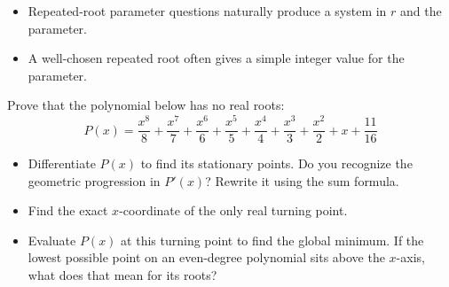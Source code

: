\begin{takeaways}
\begin{itemize}[leftmargin=*]
\item Repeated-root parameter questions naturally produce a system in $r$ and the parameter.
\item A well-chosen repeated root often gives a simple integer value for the parameter.
\end{itemize}
\end{takeaways}

\begin{problem}
Prove that the polynomial below has no real roots:
\[
P(x) = \frac{x^8}{8} + \frac{x^7}{7} + \frac{x^6}{6} + \frac{x^5}{5} + \frac{x^4}{4} + \frac{x^3}{3} + \frac{x^2}{2} + x + \frac{11}{16}
\]
\end{problem}

\begin{hintbox}
\begin{itemize}[leftmargin=*]
\item Differentiate $P(x)$ to find its stationary points. Do you recognize the geometric progression in $P'(x)$? Rewrite it using the sum formula.
\item Find the exact $x$-coordinate of the only real turning point.
\item Evaluate $P(x)$ at this turning point to find the global minimum. If the lowest possible point on an even-degree polynomial sits above the $x$-axis, what does that mean for its roots?
\end{itemize}
\end{hintbox}

